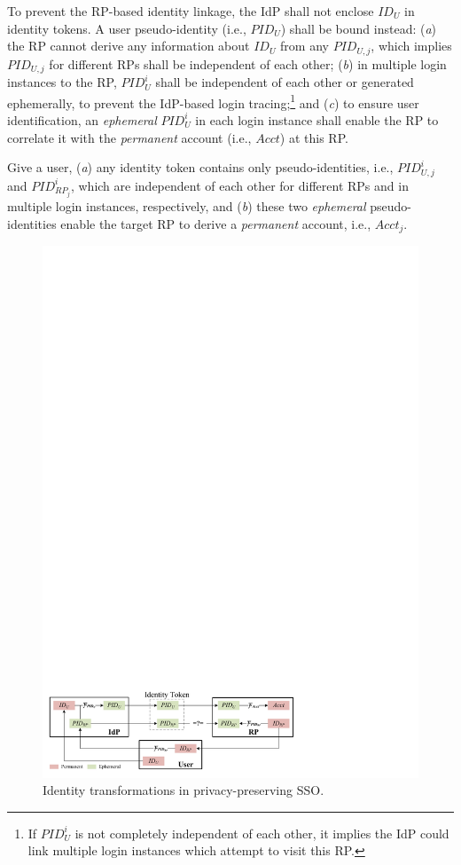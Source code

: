 To prevent the RP-based identity linkage,
 the IdP shall not enclose $ID_U$ in identity tokens.
A user pseudo-identity (i.e., $PID_U$) shall be bound instead:
    (\emph{a}) the RP cannot derive any information about $ID_U$ from any $PID_{U,j}$,
    which implies $PID_{U,j}$ for different RPs shall be independent of each other;
    (\emph{b}) in multiple login instances to the RP, $PID_U^i$ shall be independent of each other or generated ephemerally,
        to prevent the IdP-based login tracing;\footnote{If $PID_U^i$ is not completely independent of each other,
         it implies the IdP could link multiple login instances which attempt to visit this RP.}
    and (\emph{c}) to ensure user identification,
    an \emph{ephemeral} $PID_{U}^i$ in each login instance shall enable the RP to correlate it
     with the \emph{permanent} account  (i.e., $Acct$) at this RP.


Give a user,
    (\emph{a}) any identity token contains only pseudo-identities, i.e., $PID_{U,j}^i$ and $PID_{RP_j}^i$,
        which are independent of each other for different RPs and in multiple login instances, respectively,
    and (\emph{b}) these two \emph{ephemeral} pseudo-identities enable the target RP to derive a \emph{permanent} account, i.e., $Acct_j$.


\begin{figure}[tb]
  \centering
  \includegraphics[width=0.96\linewidth]{fig/IDCorrelation.pdf}
  \caption{Identity transformations in privacy-preserving SSO.}
  \label{fig:IDCorrelation}
\end{figure}

